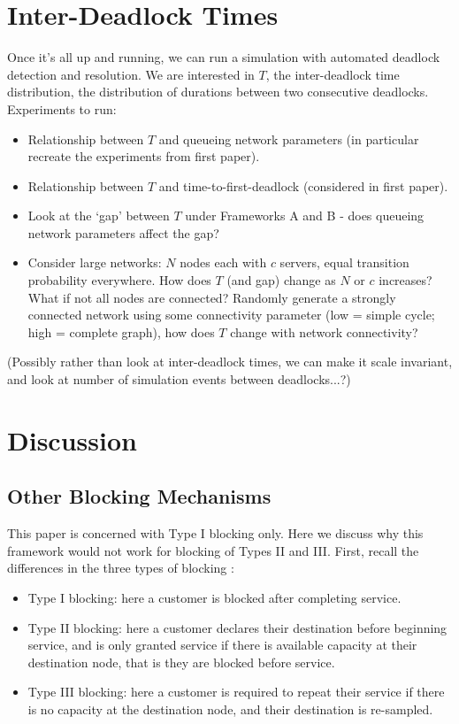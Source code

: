 \documentclass{article}
\begin{document}
\section{Inter-Deadlock Times}\label{sec:interdeadlock}
\begin{tcolorbox}[colback=orange!5!white,colframe=orange!75!black,title=TODO]
Once it's all up and running, we can run a simulation with automated deadlock detection and resolution. We are interested in $T$, the inter-deadlock time distribution, the distribution of durations between two consecutive deadlocks. Experiments to run:
\begin{itemize}
  \item Relationship between $T$ and queueing network parameters (in particular
  recreate the experiments from first paper).
  \item Relationship between $T$ and time-to-first-deadlock (considered in first
  paper).
  \item Look at the `gap' between $T$ under Frameworks A and B - does queueing
  network parameters affect the gap?
  \item Consider large networks: $N$ nodes each with $c$ servers, equal
  transition probability everywhere. How does $T$ (and gap) change as $N$ or $c$
  increases? What if not all nodes are connected? Randomly generate a strongly
  connected network using some connectivity parameter (low = simple cycle; high
  = complete graph), how does $T$ change with network connectivity?
\end{itemize}

(Possibly rather than look at inter-deadlock times, we can make it scale
invariant, and look at number of simulation events between deadlocks...?)
\end{tcolorbox}



\section{Discussion}
\subsection{Other Blocking Mechanisms}
This paper is concerned with Type I blocking only.
Here we discuss why this framework would not work for blocking of Types II and
III. First, recall the differences in the three types of blocking
\cite{onvural1986equivalencies}:

\begin{itemize}
  \item Type I blocking: here a customer is blocked after completing service.
  \item Type II blocking: here a customer declares their destination before
  beginning service, and is only granted service if there is available capacity
  at their destination node, that is they are blocked before service.
  \item Type III blocking: here a customer is required to repeat their service
  if there is no capacity at the destination node, and their destination is
  re-sampled.
\end{itemize}
\end{document}
